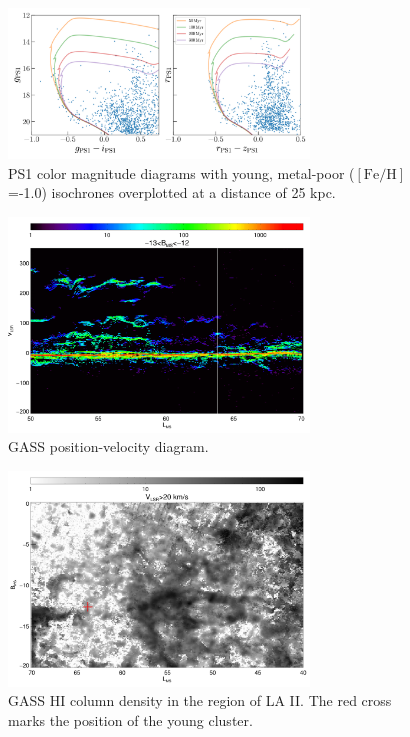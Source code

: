 \documentclass[modern]{aastex62}
\newcommand{\feh}{\ensuremath{[\textrm{Fe} / \textrm{H}]}}
\newcommand{\hi}{H{\footnotesize I} }
\begin{document}
\begin{figure}
\centering
\includegraphics[width=8cm]{isochrone.png}
\caption{PS1 color magnitude diagrams with young, metal-poor (\feh=-1.0) isochrones overplotted at
a distance of 25 kpc.}
\label{fig_isochrone}
\end{figure}

\begin{figure}
\centering
\includegraphics[width=8cm]{gass_vlsrmlon.pdf}
\caption{GASS position-velocity diagram.}
\label{fig_gass}
\end{figure}

\begin{figure}
\centering
\includegraphics[width=8cm]{gass_mlatmlon.pdf}
\caption{GASS \hi column density in the region of LA II. The red cross marks the position
of the young cluster.}
\label{fig_gass}
\end{figure}
\end{document}
